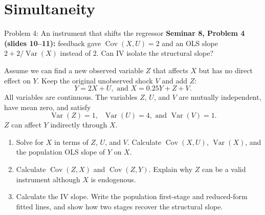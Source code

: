 \documentclass[notes,10pt, aspectratio=169]{beamer}
\newif\ifshowsolutions
\newcommand{\Var}{\operatorname{Var}}
\newcommand{\Cov}{\operatorname{Cov}}
\newcommand{\answerpart}[1]{\textcolor{blue}{\textbf{#1.}}\,}
\begin{document}
\ifshowsolutions
\begin{frame}{Solution 3: Validity must hold in the sample used}
\small
\setlength{\abovedisplayskip}{4pt}
\setlength{\belowdisplayskip}{4pt}
\answerpart{1}Take covariances within the selected population:
\[
\Cov(Z,Y\mid K=1)=\Cov(Z,X\mid K=1)+\Cov(Z,U\mid K=1)=0.40.
\]
\[
b_{\mathrm{IV},K=1}
=1+\frac{\Cov(Z,U\mid K=1)}{\Cov(Z,X\mid K=1)}
=1-\frac{0.20}{0.60}=\boxed{\frac23\ne1}.
\]
\answerpart{2}Selection depends on both $X$ and $U$, because $Y\geq3$ means $U\geq1-X$. Since $Z$ shifts $X$, keeping only high outcomes can make $Z$ correlated with $U$ among retained observations. Here relevance survives, but exogeneity fails.
\par\smallskip
\answerpart{3}In the redesigned study, selection occurs before random assignment. Under the stated exclusion assumption, assignment supports instrument exogeneity within the enrolled population. Thus
\[
b_{\mathrm{IV},\mathrm{new}}=\frac{\Cov(Q,Y)}{\Cov(Q,X)}
=\frac{0.50}{0.50}=\boxed1.
\]
This identifies the constant slope for enrolled participants. It relies on a new design; applying IV to the original outcome-selected records does not repair their selection bias automatically.
\end{frame}
\fi

\section{Simultaneity}
\begin{frame}{Problem 4: An instrument that shifts the regressor}
\small
\setlength{\abovedisplayskip}{4pt}
\setlength{\belowdisplayskip}{4pt}
\textbf{Seminar 8, Problem 4 (slides 10--11):} feedback gave $\Cov(X,U)=2$ and an OLS slope $2+2/\Var(X)$ instead of $2$. Can IV isolate the structural slope?
\par\smallskip
Assume we can find a new observed variable $Z$ that affects $X$ but has no direct effect on $Y$. Keep the original unobserved shock $V$ and add $Z$:
\[
Y=2X+U,\text{ and }X=0.25Y+Z+V.
\]
All variables are continuous. The variables $Z$, $U$, and $V$ are mutually independent, have mean zero, and satisfy
\[
\Var(Z)=1,\text{ }\Var(U)=4,\text{ and }\Var(V)=1.
\]
$Z$ can affect $Y$ indirectly through $X$.
\begin{enumerate}
\item Solve for $X$ in terms of $Z$, $U$, and $V$. Calculate $\Cov(X,U)$, $\Var(X)$, and the population OLS slope of $Y$ on $X$.
\item Calculate $\Cov(Z,X)$ and $\Cov(Z,Y)$. Explain why $Z$ can be a valid instrument although $X$ is endogenous.
\item Calculate the IV slope. Write the population first-stage and reduced-form fitted lines, and show how two stages recover the structural slope.
\end{enumerate}
\end{frame}
\end{document}
